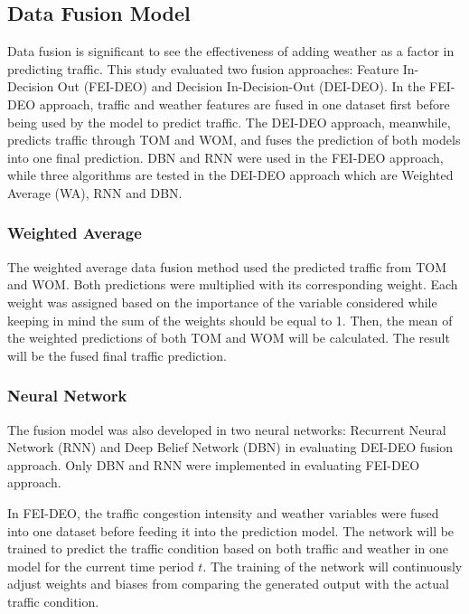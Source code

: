 \subsection{Data Fusion Model}
Data fusion is significant to see the effectiveness of adding weather as a factor in predicting traffic. This study evaluated two fusion approaches: Feature In-Decision Out (FEI-DEO) and Decision In-Decision-Out (DEI-DEO). In the FEI-DEO approach, traffic and weather features are fused in one dataset first before being used by the model to predict traffic. The DEI-DEO approach, meanwhile, predicts traffic through TOM and WOM, and fuses the prediction of both models into one final prediction. DBN and RNN were used in the FEI-DEO approach, while three algorithms are tested in the DEI-DEO approach which are Weighted Average (WA), RNN and DBN. 



\subsubsection{Weighted Average}
The weighted average data fusion method used the predicted traffic from TOM and WOM. Both predictions were multiplied with its corresponding weight. Each weight was assigned based on the importance of the variable considered while keeping in mind the sum of the weights should be equal to 1. Then, the mean of the weighted predictions of both TOM and WOM will be calculated. The result will be the fused final traffic prediction.



\subsubsection{Neural Network}
The fusion model was also developed in two neural networks: Recurrent Neural Network (RNN) and Deep Belief Network (DBN) in evaluating DEI-DEO fusion approach. Only DBN and RNN were implemented in evaluating FEI-DEO approach.

In FEI-DEO, the traffic congestion intensity and weather variables were fused into one dataset before feeding it into the prediction model. The network will be trained to predict the traffic condition based on both traffic and weather in one model for the current time period $t$. The training of the network will continuously adjust weights and biases from comparing the generated output with the actual traffic condition. 


